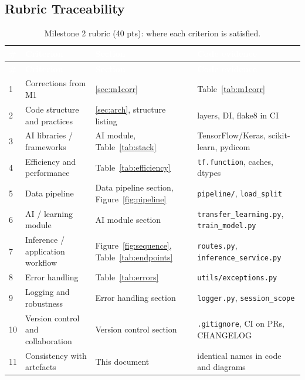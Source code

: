 \documentclass[12pt,a4paper]{article}
\newcommand{\fp}[1]{\nolinkurl{#1}}
\newcommand{\hd}[1]{\textcolor{white}{\textbf{#1}}}
\begin{document}
\subsection{Rubric Traceability}

\begin{longtable}{C{0.3cm} L{3.6cm} L{4.2cm} L{5.4cm}}
\caption{Milestone 2 rubric (40 pts): where each criterion is satisfied.}\label{tab:m2rubric}\\
\hd{\#} & \hd{Criterion} & \hd{Section} & \hd{Code evidence} \\
\endfirsthead
{}
\hd{\#} & \hd{Criterion} & \hd{Section} & \hd{Code evidence} \\
\endhead
{}
1 & Corrections from M1 & \ref{sec:m1corr} & Table~\ref{tab:m1corr} \\
2 & Code structure and practices & \ref{sec:arch}, structure listing & layers, DI, flake8 in CI \\
3 & AI libraries / frameworks & AI module, Table~\ref{tab:stack} & TensorFlow/Keras, scikit-learn, pydicom \\
4 & Efficiency and performance & Table~\ref{tab:efficiency} & \texttt{tf.function}, caches, dtypes \\
5 & Data pipeline & Data pipeline section, Figure~\ref{fig:pipeline} & \texttt{pipeline/}, \texttt{load\_split} \\
6 & AI / learning module & AI module section & \fp{transfer_learning.py}, \texttt{train\_model.py} \\
7 & Inference / application workflow & Figure~\ref{fig:sequence}, Table~\ref{tab:endpoints} & \texttt{routes.py}, \fp{inference_service.py} \\
8 & Error handling & Table~\ref{tab:errors} & \fp{utils/exceptions.py} \\
9 & Logging and robustness & Error handling section & \texttt{logger.py}, \texttt{session\_scope} \\
10 & Version control and collaboration & Version control section & \texttt{.gitignore}, CI on PRs, CHANGELOG \\
11 & Consistency with artefacts & This document & identical names in code and diagrams \\
\end{longtable}
\end{document}
